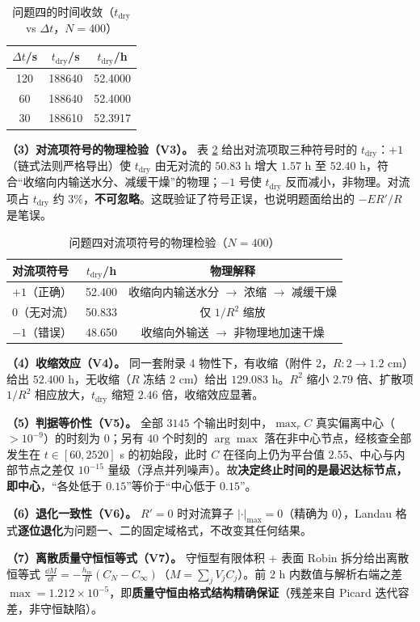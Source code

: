 \begin{table}[H]
  \centering
  \caption{问题四的时间收敛（$t_{\text{dry}}$ vs $\Delta t$，$N=400$）}
  \label{tab:p4_v2}
  \begin{tabular}{ccc}
    \toprule
    $\Delta t$/s & $t_{\text{dry}}$/s & $t_{\text{dry}}$/h \\
    \midrule
    120 & 188640 & 52.4000 \\
    60  & 188640 & 52.4000 \\
    30  & 188610 & 52.3917 \\
    \bottomrule
  \end{tabular}
\end{table}

\textbf{（3）对流项符号的物理检验（V3）。} 表 \ref{tab:p4_v3} 给出对流项取三种符号时的 $t_{\text{dry}}$：$+1$（链式法则严格导出）使 $t_{\text{dry}}$ 由无对流的 $50.83$ h 增大 $1.57$ h 至 $52.40$ h，符合“收缩向内输送水分、减缓干燥”的物理；$-1$ 号使 $t_{\text{dry}}$ 反而减小，非物理。对流项占 $t_{\text{dry}}$ 约 $3\%$，\textbf{不可忽略}。这既验证了符号正误，也说明题面给出的 $-E R'/R$ 是笔误。

\begin{table}[H]
  \centering
  \caption{问题四对流项符号的物理检验（$N=400$）}
  \label{tab:p4_v3}
  \begin{tabular}{lcc}
    \toprule
    对流项符号 & $t_{\text{dry}}$/h & 物理解释 \\
    \midrule
    $+1$（正确） & 52.400 & 收缩向内输送水分 $\to$ 浓缩 $\to$ 减缓干燥 \\
    $0$（无对流） & 50.833 & 仅 $1/R^2$ 缩放 \\
    $-1$（错误） & 48.650 & 收缩向外输送 $\to$ 非物理地加速干燥 \\
    \bottomrule
  \end{tabular}
\end{table}

\textbf{（4）收缩效应（V4）。} 同一套附录 4 物性下，有收缩（附件 2，$R:2\to1.2$ cm）给出 $52.400$ h，无收缩（$R$ 冻结 $2$ cm）给出 $129.083$ h。$R^2$ 缩小 $2.79$ 倍、扩散项 $1/R^2$ 相应放大，$t_{\text{dry}}$ 缩短 $2.46$ 倍，收缩效应显著。

\textbf{（5）判据等价性（V5）。} 全部 $3145$ 个输出时刻中，$\max_r C$ 真实偏离中心（$>10^{-9}$）的时刻为 $0$；另有 $40$ 个时刻的 $\arg\max$ 落在非中心节点，经核查全部发生在 $t\in[60,2520]$ s 的初始段，此时 $C$ 在径向上仍为平台值 $2.55$、中心与内部节点之差仅 $10^{-15}$ 量级（浮点并列噪声）。故\textbf{决定终止时间的是最迟达标节点，即中心}，“各处低于 $0.15$”等价于“中心低于 $0.15$”。

\textbf{（6）退化一致性（V6）。} $R'=0$ 时对流算子 $|\cdot|_{\max}=0$（精确为 $0$），Landau 格式\textbf{逐位退化}为问题一、二的固定域格式，不改变其任何结果。

\textbf{（7）离散质量守恒恒等式（V7）。} 守恒型有限体积 + 表面 Robin 拆分给出离散恒等式 $\frac{\dd M}{\dd t}=-\frac{h_m}{R}(C_N-C_\infty)$（$M=\sum_jV_jC_j$）。前 $2$ h 内数值与解析右端之差 $\max=1.212\times10^{-5}$，即\textbf{质量守恒由格式结构精确保证}（残差来自 Picard 迭代容差，非守恒缺陷）。
